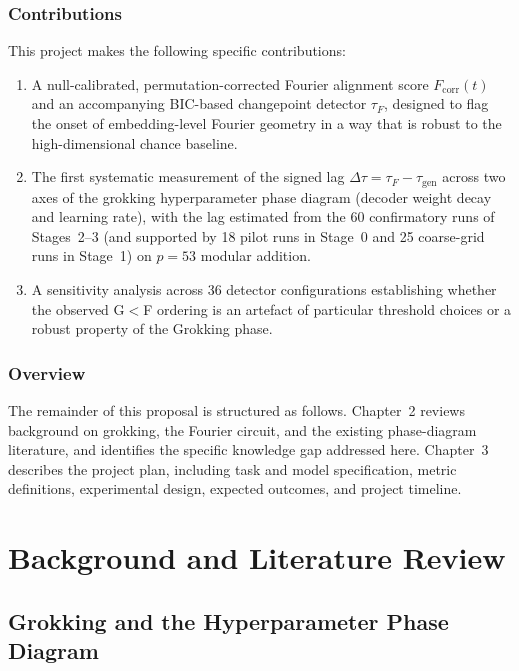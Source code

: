 \documentclass[12pt,openany,oneside,a4paper]{book}
\newcommand{\taug}{\tau_{\mathrm{gen}}}
\newcommand{\tauf}{\tau_{F}}
\newcommand{\Dtau}{\Delta\tau}
\newcommand{\fcorr}{F_{\mathrm{corr}}}
\begin{document}
\subsection{Contributions}

This project makes the following specific contributions:
\begin{enumerate}
  \item A null-calibrated, permutation-corrected Fourier alignment
    score $\fcorr(t)$ and an accompanying BIC-based changepoint
    detector $\tauf$, designed to flag the onset of embedding-level
    Fourier geometry in a way that is robust to the high-dimensional
    chance baseline.
  \item The first systematic measurement of the signed lag
    $\Dtau = \tauf - \taug$ across two axes of the grokking
    hyperparameter phase diagram (decoder weight decay and learning
    rate), with the lag estimated from the 60 confirmatory runs
    of Stages~2--3 (and supported by 18 pilot runs in Stage~0 and
    25 coarse-grid runs in Stage~1) on $p=53$ modular addition.
  \item A sensitivity analysis across 36 detector configurations
    establishing whether the observed G$<$F ordering is an artefact
    of particular threshold choices or a robust property of the
    Grokking phase.
\end{enumerate}

\subsection{Overview}

The remainder of this proposal is structured as follows.
Chapter~2 reviews background on grokking, the Fourier circuit, and
the existing phase-diagram literature, and identifies the specific
knowledge gap addressed here.
Chapter~3 describes the project plan, including task and model
specification, metric definitions, experimental design, expected
outcomes, and project timeline.

\chapter{Background and Literature Review}

\section{Grokking and the Hyperparameter Phase Diagram}
\end{document}

